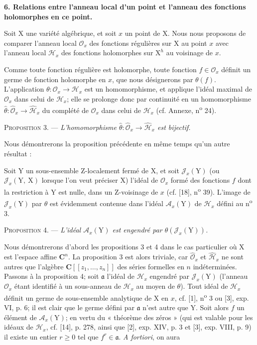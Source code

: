\textbf{6. Relations entre l'anneau local d'un point et l'anneau des fonctions holomorphes en ce point.}

Soit $\mathrm{X}$ une variété algébrique, et soit $x$ un point de $\mathrm{X}$. Nous nous proposons de comparer l'anneau local $\mathcal{O}_x$ des fonctions régulières sur $\mathrm{X}$ au point $x$ avec l'anneau local $\mathcal{H}_x$ des fonctions holomorphes sur $\mathrm{X}^h$ au voisinage de $x$.

Comme toute fonction régulière est holomorphe, toute fonction $f \in \mathcal{O}_x$ définit un germe de fonction holomorphe en $x$, que nous désignerons par $\theta(f)$. L'application $\theta : \mathcal{O}_x \to \mathcal{H}_x$ est un homomorphisme, et applique l'idéal maximal de $\mathcal{O}_x$ dans celui de $\mathcal{H}_x$; elle se prolonge donc par continuité en un homomorphisme $\hat{\theta} : \hat{\mathcal{O}}_x \to \hat{\mathcal{H}}_x$ du complété de $\mathcal{O}_x$ dans celui de $\mathcal{H}_x$ (cf. Annexe, n\textsuperscript{o} 24).

\textsc{Proposition} 3. --- \textit{L'homomorphisme $\hat{\theta} : \hat{\mathcal{O}}_x \to \hat{\mathcal{H}}_x$ est bijectif.}

Nous démontrerons la proposition précédente en même temps qu'un autre résultat :

Soit $\mathrm{Y}$ un sous-ensemble Z-localement fermé de $\mathrm{X}$, et soit $\mathcal{J}_x(\mathrm{Y})$ (ou $\mathcal{J}_x(\mathrm{Y},\ \mathrm{X})$ lorsque l'on veut préciser $\mathrm{X}$) l'idéal de $\mathcal{O}_x$ %
formé des fonctions $f$ dont la restriction à $\mathrm{Y}$ est nulle, dans un Z-voisinage de $x$ (cf. [18], n\textsuperscript{o} 39). L'image de $\mathcal{J}_x(\mathrm{Y})$ par $\theta$ est évidemment contenue dans l'idéal $\mathcal{A}_x(\mathrm{Y})$ de $\mathcal{H}_x$ défini au n\textsuperscript{o} 3.

\textsc{Proposition} 4. --- \textit{L'idéal $\mathcal{A}_x(\mathrm{Y})$ est engendré par $\theta(\mathcal{J}_x(\mathrm{Y}))$.}

Nous démontrerons d'abord les propositions 3 et 4 dans le cas particulier où $\mathrm{X}$ est l'espace affine $\mathbf{C}^n$. La proposition 3 est alors triviale, car $\hat{\mathcal{O}}_x$ et $\hat{\mathcal{H}}_x$ ne sont autres que l'algèbre $\mathbf{C}[[z_1, \ldots, z_n]]$ des séries formelles en $n$ indéterminées. Passons à la proposition 4; soit $\mathfrak{a}$ l'idéal de $\mathcal{H}_x$ engendré par $\mathcal{J}_x(\mathrm{Y})$ (l'anneau $\mathcal{O}_x$ étant identifié à un sous-anneau de $\mathcal{H}_x$ au moyen de $\theta$). Tout idéal de $\mathcal{H}_x$ définit un germe de sous-ensemble analytique de $\mathrm{X}$ en $x$, cf. [1], n\textsuperscript{o} 3 ou [3], exp. VI, p. 6; il est clair que le germe défini par $\mathfrak{a}$ n'est autre que $\mathrm{Y}$. Soit alors $f$ un élément de $\mathcal{A}_x(\mathrm{Y})$; en vertu du « théorème des zéros » (qui est valable pour les idéaux de $\mathcal{H}_x$, cf. [14], p. 278, ainsi que [2], exp. XIV, p. 3 et [3], exp. VIII, p. 9) il existe un entier $r \geqslant 0$ tel que $f^r \in \mathfrak{a}$. \textit{A fortiori}, on aura

